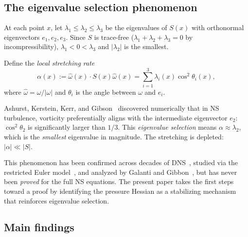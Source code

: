 \documentclass[11pt,a4paper]{article}
\theoremstyle{plain}
\theoremstyle{definition}
\theoremstyle{remark}
\begin{document}
\subsection{The eigenvalue selection phenomenon}

At each point $x$, let $\lambda_1\leq\lambda_2\leq\lambda_3$
be the eigenvalues of $S(x)$ with orthonormal eigenvectors
$e_1,e_2,e_3$.  Since $S$ is trace-free
($\lambda_1+\lambda_2+\lambda_3=0$ by incompressibility),
$\lambda_1<0<\lambda_3$ and $|\lambda_2|$ is the smallest.

Define the \emph{local stretching rate}
\begin{equation}\label{eq:alpha-def}
\alpha(x) := \hat\omega(x)\cdot S(x)\hat\omega(x)
= \sum_{i=1}^3 \lambda_i(x)\cos^2\theta_i(x),
\end{equation}
where $\hat\omega = \omega/|\omega|$ and $\theta_i$ is
the angle between $\omega$ and $e_i$.

Ashurst, Kerstein, Kerr, and Gibson~\cite{AKKG87}
discovered numerically that in NS turbulence, vorticity
preferentially aligns with the intermediate eigenvector
$e_2$: $\cos^2\theta_2$ is significantly larger than
$1/3$.  This \emph{eigenvalue selection} means
$\alpha\approx\lambda_2$, which is the \emph{smallest}
eigenvalue in magnitude.  The stretching is depleted:
$|\alpha| \ll |S|$.

This phenomenon has been confirmed across decades of
DNS~\cite{AKKG87,Tsinober92,JimenezWray98}, studied
via the restricted Euler
model~\cite{Vieillefosse82,Cantwell92},
and analyzed by
Galanti and Gibbon~\cite{GalantiGibbon97}, but has
never been \emph{proved} for the full NS equations.
The present paper takes the first steps toward a proof
by identifying the pressure Hessian as a stabilizing
mechanism that reinforces eigenvalue selection.

\subsection{Main findings}
\end{document}
